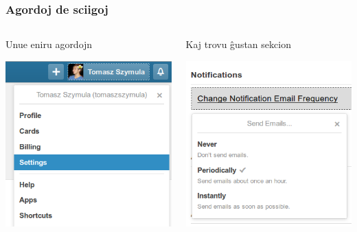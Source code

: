   \begin{frame}
    \frametitle{Agordoj de sciigoj}
	\begin{columns}
	    \begin{block}{Unue eniru agordojn}
	    	\begin{center}
	     	\includegraphics[scale=0.35]{ekranoj/eniru-agordojn}
	    	\end{center}
    	\end{block}
    	\begin{block}{Kaj trovu ĝustan sekcion}
    		\begin{center}
    		\includegraphics[scale=0.35]{ekranoj/sciigoj-agordo}
    		\end{center}
    	\end{block}

	\end{columns}
  \end{frame}
